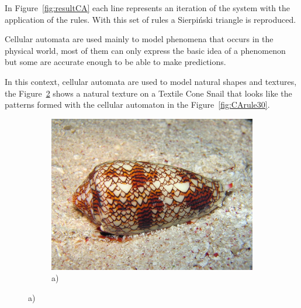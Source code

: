 In Figure~\ref{fig:resultCA} each line represents an iteration of the system with the application of the rules. With this set of rules a Sierpiński triangle is reproduced.


Cellular automata are used mainly to model phenomena that occurs in the physical world, most of them can only express the basic idea of a phenomenon but some are accurate enough to be able to make predictions.

In this context, cellular automata are used to model natural shapes and textures, the Figure~\ref{fig:CAshell} shows a natural texture on a Textile Cone Snail that looks like the patterns formed with the cellular automaton in the Figure~\ref{fig:CArule30}.



\begin{figure}
        \centering
        \begin{subfigure}[b]{0.6\textwidth}
                \includegraphics[width=\textwidth]{img/Theory/Cellular_A/shell.jpeg}
                \caption{a)}
				\label{fig:CAshell}
        \end{subfigure}%


\end{figure}
